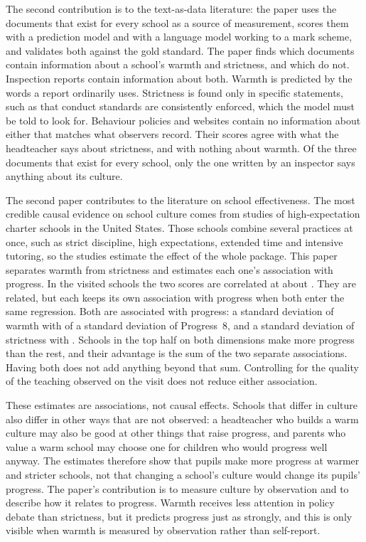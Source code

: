 The second contribution is to the
text-as-data literature: the paper uses the documents that exist for every
school as a source of measurement, scores them with a prediction model and
with a language model working to a mark scheme, and validates both against
the gold standard. The paper finds which documents contain information
about a school's warmth and strictness, and which do not. Inspection
reports contain information about both. Warmth is predicted by the words a report ordinarily uses.
Strictness is found only in specific statements, such as that conduct
standards are consistently enforced, which the model must be told to look
for. Behaviour policies and websites contain no information about either
that matches what observers record. Their scores agree with what the headteacher says about
strictness, and with nothing about warmth. Of the three documents that
exist for every school, only the one written by an inspector says anything
about its culture.

The second paper contributes to the literature on school effectiveness. The
most credible causal evidence on school culture comes from studies of
high-expectation charter schools in the United States. Those schools
combine several practices at once, such as strict discipline, high
expectations, extended time and intensive tutoring, so the studies
estimate the effect of the whole package. This paper separates warmth from
strictness and estimates each one's association with progress. In the
visited schools the two scores are correlated at about
\CorrWarmthStrictnessEnacted{}. They are related, but each keeps its own
association with progress when both enter the same regression. Both are
associated with progress: a standard deviation of warmth with
\PrimarySpecWSD{} of a standard deviation of Progress~8, and a standard
deviation of strictness with \PrimarySpecSSD{}. Schools in the top half on
both dimensions make more progress than the rest, and their advantage is
the sum of the two separate associations. Having both does not add
anything beyond that sum. Controlling for the
quality of the teaching observed on the visit does not reduce either
association.

These estimates are associations, not causal effects. Schools that differ in
culture also differ in other ways that are not observed: a headteacher who
builds a warm culture may also be good at other things that raise
progress, and parents who value a warm school may choose one for children
who would progress well anyway. The estimates therefore show that pupils
make more progress at warmer and stricter schools, not that changing a
school's culture would change its pupils' progress. The paper's
contribution is to measure culture by observation and to describe how it
relates to progress. Warmth receives less attention in policy
debate than strictness, but it predicts progress just as strongly, and this
is only visible when warmth is measured by observation rather than
self-report.

